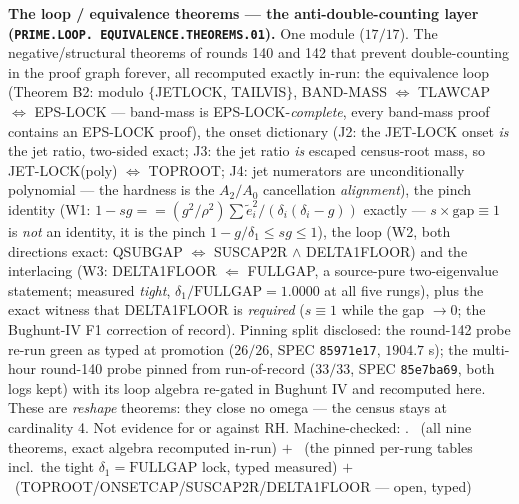 \par\smallskip\noindent\textbf{The loop / equivalence theorems
--- the anti-double-counting layer
(\texttt{PRIME.\allowbreak LOOP.\allowbreak
EQUIVALENCE.\allowbreak THEOREMS.01}).}
One module ($17/17$).  The negative/structural theorems of
rounds 140 and 142 that prevent double-counting in the proof
graph forever, all recomputed exactly in-run: the equivalence
loop (Theorem B2: modulo $\{$JETLOCK, TAILVIS$\}$,
BAND-MASS $\Leftrightarrow$ TLAWCAP $\Leftrightarrow$ EPS-LOCK
--- band-mass is EPS-LOCK-\emph{complete}, every band-mass proof
contains an EPS-LOCK proof), the onset dictionary (J2: the
JET-LOCK onset \emph{is} the jet ratio, two-sided exact; J3: the
jet ratio \emph{is} escaped census-root mass, so
JET-LOCK(poly) $\Leftrightarrow$ TOPROOT; J4: jet numerators are
unconditionally polynomial --- the hardness is the $A_2/A_0$
cancellation \emph{alignment}), the pinch identity (W1:
$1 - sg == (g^2/\rho^2)\sum \tilde e_i^2/(\delta_i(\delta_i-g))$
exactly --- $s \times \mathrm{gap} \equiv 1$ is \emph{not} an
identity, it is the pinch $1 - g/\delta_1 \le sg \le 1$), the
loop (W2, both directions exact:
QSUBGAP $\Leftrightarrow$ SUSCAP2R $\wedge$ DELTA1FLOOR) and the
interlacing (W3: DELTA1FLOOR $\Leftarrow$ FULLGAP, a source-pure
two-eigenvalue statement; measured \emph{tight},
$\delta_1/\mathrm{FULLGAP} = 1.0000$ at all five rungs), plus
the exact witness that DELTA1FLOOR is \emph{required} ($s \equiv
1$ while the gap $\to 0$; the Bughunt-IV F1 correction of
record).  Pinning split disclosed: the round-142 probe re-run
green as typed at promotion ($26/26$, SPEC \texttt{85971e17},
$1904.7$ s); the multi-hour round-140 probe pinned from
run-of-record ($33/33$, SPEC \texttt{85e7ba69}, both logs kept)
with its loop algebra re-gated in Bughunt IV and recomputed
here.  These are \emph{reshape} theorems: they close no omega
--- the census stays at cardinality 4.  Not evidence for or
against RH.
Machine-checked: .
\mE\ (all nine theorems, exact algebra recomputed in-run) $+$
\mC\ (the pinned per-rung tables incl.\ the tight
$\delta_1 = \mathrm{FULLGAP}$ lock, typed measured) $+$ \mO\
(TOPROOT/ONSETCAP/SUSCAP2R/DELTA1FLOOR --- open, typed)
\par\smallskip


